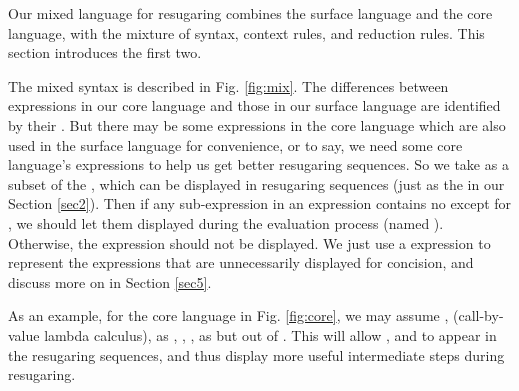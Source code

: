 Our mixed language for resugaring combines the surface language and the core language, with the mixture of syntax, context rules, and reduction rules. This section introduces the first two.

The mixed syntax is described in Fig.  \ref{fig:mix}.
%
The differences between expressions in our core language and those in our surface language are identified by their . But there may be some expressions in the core language which are also used in the surface language for convenience, or to say, we need some core language's expressions to help us get better resugaring sequences. So we take  as a subset of the , which can be displayed in resugaring sequences (just as the  in our Section \ref{sec2}). Then if any sub-expression in an expression contains no  except for , we should let them displayed during the evaluation process (named ). Otherwise, the expression should not be displayed. We just use a  expression to represent the expressions that are unnecessarily displayed for concision, and discuss more on   in Section \ref{sec5}.




As an example, for the core language in Fig.  \ref{fig:core},
we may assume , \m{$\lambda$} (call-by-value lambda calculus),  as , , ,  as  but out of . This will allow , \m{$\lambda$} and  to appear in the resugaring sequences, and thus display more useful intermediate steps during resugaring.


